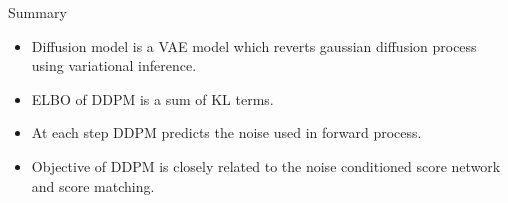 \begin{frame}{Summary}
	\begin{itemize}
		\item Diffusion model is a VAE model which reverts gaussian diffusion process using variational inference.
		\vfill
		\item ELBO of DDPM is a sum of KL terms.
		\vfill
		\item At each step DDPM predicts the noise used in forward process.
		\vfill
		\item Objective of DDPM is closely related to the noise conditioned score network and score matching.
	\end{itemize}
\end{frame}
 